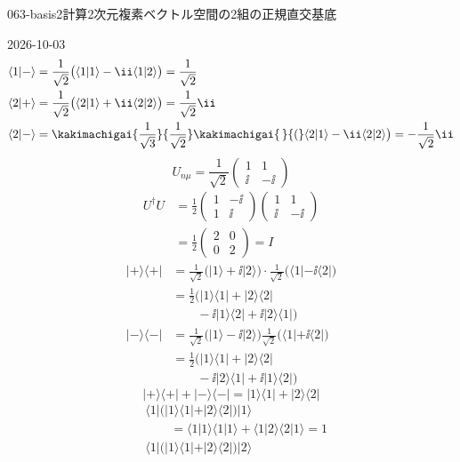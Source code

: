 \documentclass[uplatex,dvipdfmx,a4paper,11pt]{jsarticle}
\begin{document}
\begin{mondai}{063-basis2}{計算}{2次元複素ベクトル空間の2組の正規直交基底}
\begin{kotaeutsushi}{2026-10-03}
\begin{align*}
  \langle1|-\rangle&=\frac{1}{\sqrt{2}}\bigl(\langle1|1\rangle-\ii\langle1|2\rangle\bigr)=\frac{1}{\sqrt{2}}\\
  \langle2|+\rangle&=\frac{1}{\sqrt{2}}\bigl(\langle2|1\rangle+\ii\langle2|2\rangle\bigr)=\frac{1}{\sqrt{2}}\ii\\
  \langle2|-\rangle&=\kakimachigai{\frac{1}{\sqrt{3}}}{\frac{1}{\sqrt{2}}}\kakimachigai{\,}{(}\langle2|1\rangle-\ii\langle2|2\rangle\bigr)=-\frac{1}{\sqrt{2}}\ii
\end{align*}
\[
  U_{n\mu}=\frac{1}{\sqrt{2}}\begin{pmatrix}1&1\\\ii&-\ii\end{pmatrix}
\]
\begin{align*}
  U^{\dagger}U&=\frac{1}{2}\begin{pmatrix}1&-\ii\\1&\ii\end{pmatrix}\begin{pmatrix}1&1\\\ii&-\ii\end{pmatrix}\\
  &=\frac{1}{2}\begin{pmatrix}2&0\\0&2\end{pmatrix}=I
\end{align*}
\begin{align*}
  |+\rangle\langle+|&=\frac{1}{\sqrt{2}}\bigl(|1\rangle+\ii|2\rangle\bigr)\cdot\frac{1}{\sqrt{2}}\bigl(\langle1|-\ii\langle2|\bigr)\\
  &=\frac{1}{2}\bigl(|1\rangle\langle1|+|2\rangle\langle2|\\
  &\qquad-\ii|1\rangle\langle2|+\ii|2\rangle\langle1|\bigr)\\
  |-\rangle\langle-|&=\frac{1}{\sqrt{2}}\bigl(|1\rangle-\ii|2\rangle\bigr)\frac{1}{\sqrt{2}}\bigl(\langle1|+\ii\langle2|\bigr)\\
  &=\frac{1}{2}\bigl(|1\rangle\langle1|+|2\rangle\langle2|\\
  &\qquad-\ii|2\rangle\langle1|+\ii|1\rangle\langle2|\bigr)
\end{align*}
\[
  |+\rangle\langle+|+|-\rangle\langle-|=|1\rangle\langle1|+|2\rangle\langle2|
\]
\begin{align*}
  &\langle1|\bigl(|1\rangle\langle1|+|2\rangle\langle2|\bigr)|1\rangle\\
  &\qquad=\langle1|1\rangle\langle1|1\rangle+\langle1|2\rangle\langle2|1\rangle=1\\
  &\langle1|\bigl(|1\rangle\langle1|+|2\rangle\langle2|\bigr)|2\rangle\\

\end{align*}
\end{kotaeutsushi}
\end{mondai}
\end{document}
